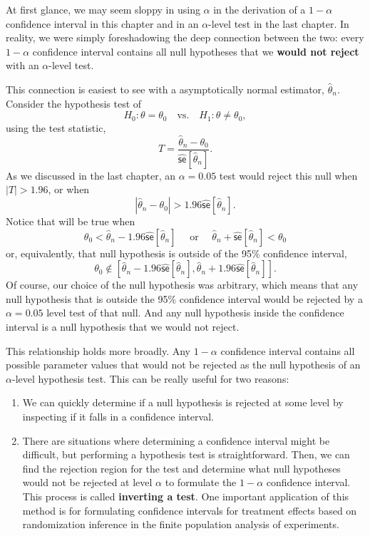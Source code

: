 \documentclass[
  letterpaper,
  DIV=11,
  numbers=noendperiod]{scrreprt}
\providecommand{\tightlist}{%
  \setlength{\itemsep}{0pt}\setlength{\parskip}{0pt}}\usepackage{longtable,booktabs,array}
\newcommand{\se}{\textsf{se}}
\theoremstyle{definition}
\theoremstyle{plain}
\theoremstyle{definition}
\theoremstyle{remark}
\begin{document}
At first glance, we may seem sloppy in using \(\alpha\) in the
derivation of a \(1 - \alpha\) confidence interval in this chapter and
in an \(\alpha\)-level test in the last chapter. In reality, we were
simply foreshadowing the deep connection between the two: every
\(1-\alpha\) confidence interval contains all null hypotheses that we
\textbf{would not reject} with an \(\alpha\)-level test.

This connection is easiest to see with a asymptotically normal
estimator, \(\widehat{\theta}_n\). Consider the hypothesis test of \[ 
H_0: \theta = \theta_0 \quad \text{vs.}\quad H_1: \theta \neq \theta_0,
\] using the test statistic, \[ 
T = \frac{\widehat{\theta}_{n} - \theta_{0}}{\widehat{\se}[\widehat{\theta}_{n}]}. 
\] As we discussed in the last chapter, an \(\alpha = 0.05\) test would
reject this null when \(|T| > 1.96\), or when \[ 
|\widehat{\theta}_{n} - \theta_{0}| > 1.96 \widehat{\se}[\widehat{\theta}_{n}]. 
\] Notice that will be true when \[ 
\theta_{0} < \widehat{\theta}_{n} - 1.96\widehat{\se}[\widehat{\theta}_{n}]\quad \text{ or  }\quad  \widehat{\theta}_{n} +  \widehat{\se}[\widehat{\theta}_{n}] < \theta_{0}
\] or, equivalently, that null hypothesis is outside of the 95\%
confidence interval,
\[\theta_0 \notin \left[\widehat{\theta}_{n} - 1.96\widehat{\se}[\widehat{\theta}_{n}], \widehat{\theta}_{n} + 1.96\widehat{\se}[\widehat{\theta}_{n}]\right].\]
Of course, our choice of the null hypothesis was arbitrary, which means
that any null hypothesis that is outside the 95\% confidence interval
would be rejected by a \(\alpha = 0.05\) level test of that null. And
any null hypothesis inside the confidence interval is a null hypothesis
that we would not reject.

This relationship holds more broadly. Any \(1-\alpha\) confidence
interval contains all possible parameter values that would not be
rejected as the null hypothesis of an \(\alpha\)-level hypothesis test.
This can be really useful for two reasons:

\begin{enumerate}
\def\labelenumi{\arabic{enumi}.}
\tightlist
\item
  We can quickly determine if a null hypothesis is rejected at some
  level by inspecting if it falls in a confidence interval.
\item
  There are situations where determining a confidence interval might be
  difficult, but performing a hypothesis test is straightforward. Then,
  we can find the rejection region for the test and determine what null
  hypotheses would not be rejected at level \(\alpha\) to formulate the
  \(1-\alpha\) confidence interval. This process is called
  \textbf{inverting a test}. One important application of this method is
  for formulating confidence intervals for treatment effects based on
  randomization inference in the finite population analysis of
  experiments.
\end{enumerate}
\end{document}
